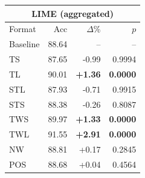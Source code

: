 \begin{tabular}{lrrr}
\toprule
\multicolumn{4}{c}{\textbf{LIME (aggregated)}} \\
\midrule
Format & Acc & $\Delta$\% & $p$ \\
\midrule
Baseline & 88.64 & -- & -- \\
\midrule
TS & 87.65 & -0.99 & 0.9994 \\
TL & 90.01 & \textbf{+1.36} & \textbf{0.0000} \\
STL & 87.93 & -0.71 & 0.9915 \\
STS & 88.38 & -0.26 & 0.8087 \\
TWS & 89.97 & \textbf{+1.33} & \textbf{0.0000} \\
TWL & 91.55 & \textbf{+2.91} & \textbf{0.0000} \\
NW & 88.81 & +0.17 & 0.2845 \\
POS & 88.68 & +0.04 & 0.4564 \\
\bottomrule
\end{tabular}